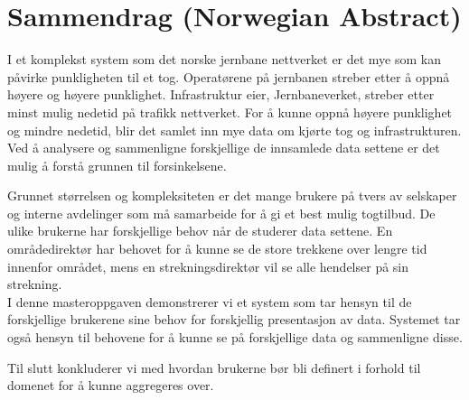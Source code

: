 \section*{Sammendrag (Norwegian Abstract)}

I et komplekst system som det norske jernbane nettverket er det mye som kan
påvirke punkligheten til et tog. Operatørene på jernbanen streber etter å oppnå
høyere og høyere punklighet. Infrastruktur eier, Jernbaneverket,  streber etter
minst mulig nedetid på trafikk nettverket. For å kunne oppnå høyere punklighet
og mindre nedetid, blir det samlet inn mye data om kjørte tog og
infrastrukturen. Ved å analysere og sammenligne forskjellige de innsamlede data settene er det mulig å forstå grunnen til forsinkelsene.

Grunnet størrelsen og kompleksiteten er det mange brukere på tvers av 
selskaper og interne avdelinger som må samarbeide for å gi et best mulig 
togtilbud. De ulike brukerne har forskjellige behov når de studerer data 
settene. En områdedirektør har behovet for å kunne se de store trekkene over
lengre tid innenfor området, mens en strekningsdirektør vil se alle hendelser
på sin strekning.\\

I denne masteroppgaven demonstrerer vi et system som tar hensyn til de
forskjellige brukerene sine behov for forskjellig presentasjon av data.
Systemet tar også hensyn til behovene for å kunne se på forskjellige data
og sammenligne disse.

Til slutt konkluderer vi med hvordan brukerne bør bli definert i forhold til
domenet for å kunne aggregeres over.
	
\clearpage
